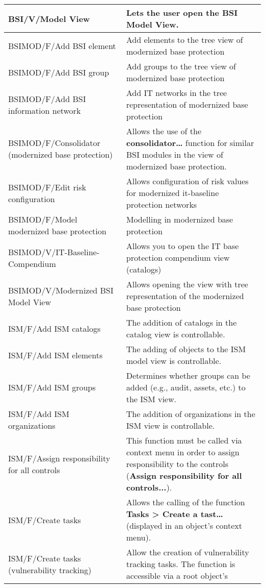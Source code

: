 \documentclass[a4paper,10pt]{book}
\begin{document}
\begin{longtable}{| p{5cm} | p{6cm} |}
BSI/V/Model View & Lets the user open the BSI Model View. \\[10pt] \hline
BSIMOD/F/Add BSI element & Add elements to the tree view of modernized base protection \\[10pt] \hline
BSIMOD/F/Add BSI group & Add groups to the tree view of modernized base protection \\[10pt] \hline
BSIMOD/F/Add BSI information network & Add IT networks in the tree representation of modernized base protection \\[10pt] \hline
BSIMOD/F/Consolidator (modernized base protection) & Allows the use of the \textbf{consolidator…} function for similar BSI modules in the view of modernized base protection.\\[10pt] \hline
BSIMOD/F/Edit risk configuration & Allows configuration of risk values for modernized it-baseline protection networks \\[10pt] \hline
BSIMOD/F/Model modernized base protection & Modelling in modernized base protection \\[10pt] \hline
BSIMOD/V/IT-Baseline-Compendium & Allows you to open the IT base protection compendium view (catalogs) \\[10pt] \hline
BSIMOD/V/Modernized BSI Model View & Allows opening the view with tree representation of the modernized base protection \\[10pt] \hline
ISM/F/Add ISM catalogs & The addition of catalogs in the catalog view is
controllable. \\[10pt] \hline
ISM/F/Add ISM elements & The adding of objects to the ISM model view is
controllable. \\[10pt] \hline
ISM/F/Add ISM groups & Determines whether groups can be added (e.g., audit,
assets, etc.) to the ISM view. \\[10pt] \hline
ISM/F/Add ISM organizations & The addition of organizations in the ISM view is
controllable. \\[10pt] \hline
ISM/F/Assign responsibility for all controls & This function must be called via
context menu in order to assign responsibility to the controls (\textbf{Assign
responsibility for all controls...}). \\[10pt] \hline
ISM/F/Create tasks & Allows the calling of the function \textbf{Tasks > Create
a tast…} (displayed in an object's context menu). \\[10pt] \hline
ISM/F/Create tasks (vulnerability tracking) & Allow the creation of
vulnerability tracking tasks. The function is accessible via a root object's

\end{longtable}
\end{document}
